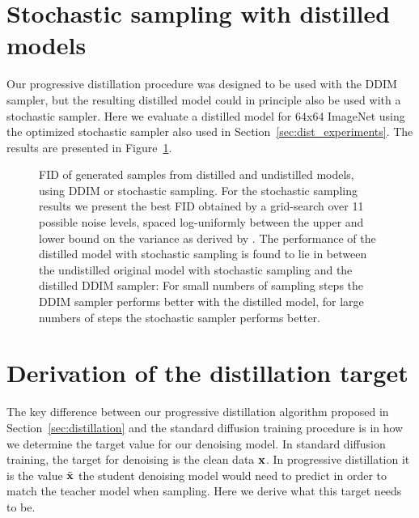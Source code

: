 \documentclass[hidelinks]{article} %
\begin{document}
\section{Stochastic sampling with distilled models}
\label{app:stoch_distill}
Our progressive distillation procedure was designed to be used with the DDIM sampler, but the resulting distilled model could in principle also be used with a stochastic sampler. Here we evaluate a distilled model for 64x64 ImageNet using the optimized stochastic sampler also used in Section~\ref{sec:dist_experiments}. The results are presented in Figure~\ref{fig:distilled_stoch}.

\begin{figure}[htb]
\centering
{}
\caption{FID of generated samples from distilled and undistilled models, using DDIM or stochastic sampling. For the stochastic sampling results we present the best FID obtained by a grid-search over 11 possible noise levels, spaced log-uniformly between the upper and lower bound on the variance as derived by \cite{ho2020denoising}. The performance of the distilled model with stochastic sampling is found to lie in between the undistilled original model with stochastic sampling and the distilled DDIM sampler: For small numbers of sampling steps the DDIM sampler performs better with the distilled model, for large numbers of steps the stochastic sampler performs better.}
\label{fig:distilled_stoch}
\end{figure}

\section{Derivation of the distillation target}
\label{app:dist_target}
The key difference between our progressive distillation algorithm proposed in Section~\ref{sec:distillation} and the standard diffusion training procedure is in how we determine the target value for our denoising model. In standard diffusion training, the target for denoising is the clean data ${\mathbf{x}}$. In progressive distillation it is the value $\tilde{{\mathbf{x}}}$ the student denoising model would need to predict in order to match the teacher model when sampling. Here we derive what this target needs to be.
\end{document}
